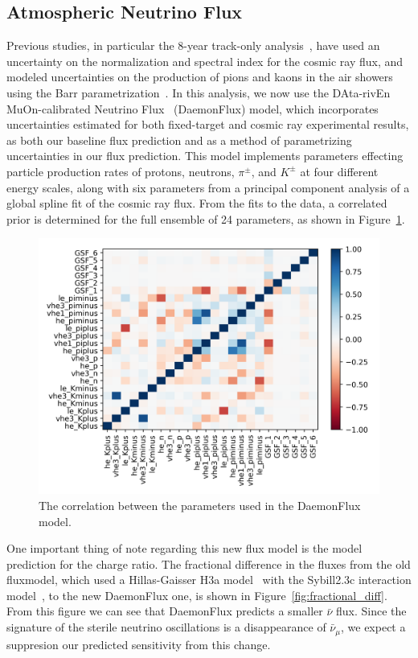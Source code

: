 \documentclass[main.tex]{subfiles}
\begin{document}
\subsection{Atmospheric Neutrino Flux}\label{sec:daemon_sense}
Previous studies, in particular the 8-year track-only analysis~\cite{Aartsen_2020,Aartsen_2020_prd}, have used an uncertainty on the normalization and spectral index for the cosmic ray flux, and modeled uncertainties on the production of pions and kaons in the air showers using the Barr parametrization~\cite{PhysRevD.74.094009}. 
In this analysis, we now use the DAta-rivEn MuOn-calibrated Neutrino Flux~\cite{yanez2023daemonflux} (DaemonFlux) model, which incorporates uncertainties estimated for both fixed-target and cosmic ray experimental results, as both our baseline flux prediction and as a method of parametrizing uncertainties in our flux prediction. 
This model implements parameters effecting particle production rates of protons, neutrons, $\pi^{\pm}$, and $K^{\pm}$ at four different energy scales, along with six parameters from a principal component analysis of a global spline fit of the cosmic ray flux. 
From the fits to the data, a correlated prior is determined for the full ensemble of 24 parameters, as shown in Figure~\ref{fig:daemon_cor}.
\begin{figure}
    \centering
    \includegraphics[width=0.7\linewidth]{figures/daemon_cov.png}
    \caption{The correlation between the parameters used in the DaemonFlux model.}\label{fig:daemon_cor}
\end{figure}

One important thing of note regarding this new flux model is the model prediction for the charge ratio. 
The fractional difference in the fluxes from the old fluxmodel, which used a Hillas-Gaisser H3a model~\cite{GAISSER2012801}  with the Sybill2.3c interaction model~\cite{Riehn:2017mfm}, to the new DaemonFlux one, is shown in Figure~\ref{fig:fractional_diff}. 
From this figure we can see that DaemonFlux predicts a smaller $\bar{\nu}$ flux. 
Since the signature of the sterile neutrino oscillations is a disappearance of $\bar{\nu}_{\mu}$, we expect a suppresion our predicted sensitivity from this change.
\end{document}
